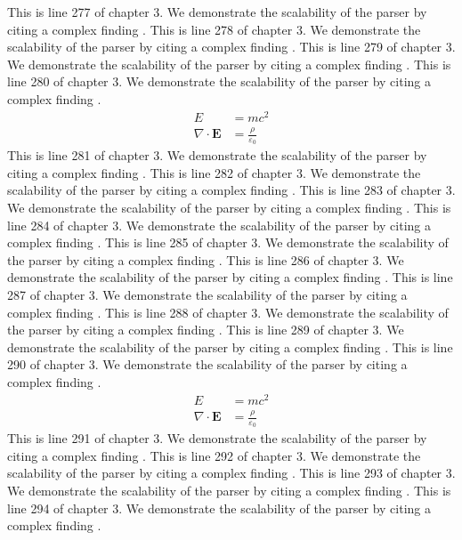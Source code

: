 This is line 277 of chapter 3. We demonstrate the scalability of the parser by citing a complex finding \cite{ref3_277}.
This is line 278 of chapter 3. We demonstrate the scalability of the parser by citing a complex finding \cite{ref3_278}.
This is line 279 of chapter 3. We demonstrate the scalability of the parser by citing a complex finding \cite{ref3_279}.
This is line 280 of chapter 3. We demonstrate the scalability of the parser by citing a complex finding \cite{ref3_280}.
\begin{align*}
  E &= mc^2 \\
  \nabla \cdot \mathbf{E} &= \frac{\rho}{\varepsilon_0}
\end{align*}
This is line 281 of chapter 3. We demonstrate the scalability of the parser by citing a complex finding \cite{ref3_281}.
This is line 282 of chapter 3. We demonstrate the scalability of the parser by citing a complex finding \cite{ref3_282}.
This is line 283 of chapter 3. We demonstrate the scalability of the parser by citing a complex finding \cite{ref3_283}.
This is line 284 of chapter 3. We demonstrate the scalability of the parser by citing a complex finding \cite{ref3_284}.
This is line 285 of chapter 3. We demonstrate the scalability of the parser by citing a complex finding \cite{ref3_285}.
This is line 286 of chapter 3. We demonstrate the scalability of the parser by citing a complex finding \cite{ref3_286}.
This is line 287 of chapter 3. We demonstrate the scalability of the parser by citing a complex finding \cite{ref3_287}.
This is line 288 of chapter 3. We demonstrate the scalability of the parser by citing a complex finding \cite{ref3_288}.
This is line 289 of chapter 3. We demonstrate the scalability of the parser by citing a complex finding \cite{ref3_289}.
This is line 290 of chapter 3. We demonstrate the scalability of the parser by citing a complex finding \cite{ref3_290}.
\begin{align*}
  E &= mc^2 \\
  \nabla \cdot \mathbf{E} &= \frac{\rho}{\varepsilon_0}
\end{align*}
This is line 291 of chapter 3. We demonstrate the scalability of the parser by citing a complex finding \cite{ref3_291}.
This is line 292 of chapter 3. We demonstrate the scalability of the parser by citing a complex finding \cite{ref3_292}.
This is line 293 of chapter 3. We demonstrate the scalability of the parser by citing a complex finding \cite{ref3_293}.
This is line 294 of chapter 3. We demonstrate the scalability of the parser by citing a complex finding \cite{ref3_294}.
